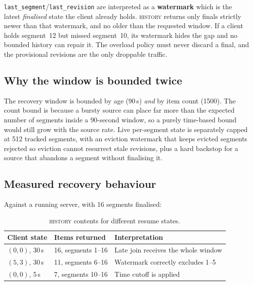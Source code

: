 \documentclass[11pt,a4paper]{article}
\begin{document}
\texttt{last\_segment}/\texttt{last\_revision} are interpreted as a
\textbf{watermark} which is the latest \emph{finalised} state the client already
holds. \textsc{history} returns only finals strictly newer than that
watermark, and no older than the requested window. If a client holds segment~12 but
missed segment~10, its watermark hides the gap and no bounded history
can repair it. The overload policy must never discard
a final, and the provisional revisions are the only droppable traffic.

\subsection{Why the window is bounded twice}

The recovery window is bounded by age (90\,s) \emph{and} by item count
(1500). The count bound is because a bursty source can
place far more than the expected number of segments inside a
90-second window, so a purely time-based bound would still grow with
the source rate. Live per-segment state is separately capped at 512
tracked segments, with an eviction watermark that keeps evicted
segments rejected so eviction cannot resurrect stale revisions, plus a
hard backstop for a source that abandons a segment without finalising
it.

\subsection{Measured recovery behaviour}

Against a running server, with 16 segments finalised:

\begin{table}[h]
\centering\small
\begin{tabular}{@{}llp{6.4cm}@{}}
\toprule
\textbf{Client state} & \textbf{Items returned} & \textbf{Interpretation} \\
\midrule
$(0,0)$, 30\,s  & 16, segments 1--16  & Late join receives the whole window \\
$(5,3)$, 30\,s  & 11, segments 6--16  & Watermark correctly excludes 1--5 \\
$(0,0)$, 5\,s   & 7,  segments 10--16 & Time cutoff is applied \\
\bottomrule
\end{tabular}
\caption{\textsc{history} contents for different resume states.}
\end{table}

\end{document}
